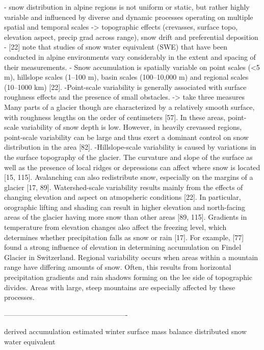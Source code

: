 \documentclass[twocolumn,letterpaper]{igs}
\begin{document}
- snow distribution in alpine regions is not uniform or static, but
rather highly variable and influenced by diverse and dynamic processes operating on multiple spatial and temporal scales -> topographic effects (crevasses, surface topo, elevation aspect, precip grad across range), snow drift and preferential deposition
-  [22] note that studies of snow water equivalent (SWE) that have been conducted in
alpine environments vary considerably in the extent and spacing of their measurements.
- Snow accumulation is spatially variable on point scales (<5 m), hillslope scales (1–100 m),
basin scales (100–10,000 m) and regional scales (10–1000 km) [22].
-Point-scale variability is generally associated with surface roughness effects and the
presence of small obstacles. -> take three measures
Many parts of a glacier though
are characterized by a relatively smooth surface, with roughness lengths on the order of
centimeters [57]. In these areas, point-scale variability of snow depth is low. However, in
heavily crevassed regions, point-scale variability can be large and thus exert a dominant
control on snow distribution in the area [82].
-Hillslope-scale variability is caused by variations in the surface topography of the glacier.
The curvature and slope of the surface as well as the presence of local ridges or depressions
can affect where snow is located [15, 115]. Avalanching can also redistribute snow, especially
on the margins of a glacier [17, 89].
Watershed-scale variability results mainly from the effects of changing elevation and
aspect on atmopsheric conditions [22]. In particular, orographic lifting and shading can
result in higher elevation and north-facing areas of the glacier having more snow than other
areas [89, 115]. Gradients in temperature from elevation changes also affect the freezing
level, which determines whether precipitation falls as snow or rain [17]. For example, [77]
found a strong influence of elevation in determining accumulation on Findel Glacier in
Switzerland.
Regional variability occurs when areas within a mountain range have differing amounts of
snow. Often, this results from horizontal precipitation gradients and rain shadows forming
on the lee side of topographic divides. Areas with large, steep mountains are especially
affected by these processes.

----------------------------------------------------

derived accumulation
estimated winter surface mass balance
distributed snow water equivalent



%



\end{document}
